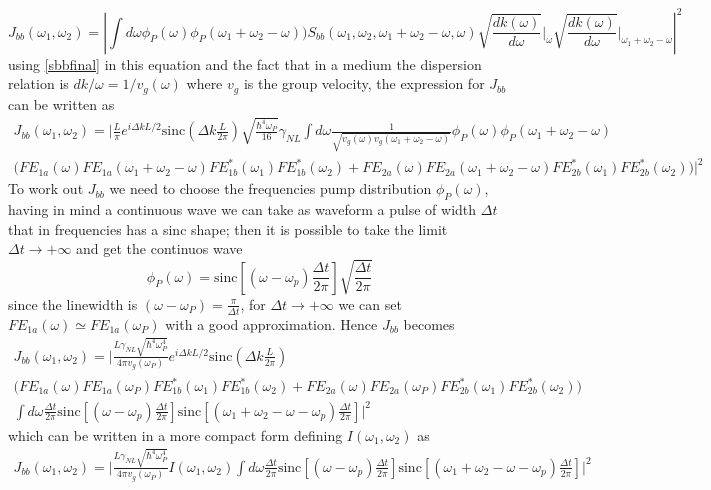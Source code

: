 \[J_{bb}(\omega_1,\omega_2) = \left|\int d\omega \phi_P(\omega)\phi_P(\omega_1 + \omega_2 - \omega))S_{bb}(\omega_1,\omega_2,\omega_1+\omega_2-\omega,\omega)\sqrt{ \frac{dk(\omega)}{d\omega}}\Bigg|_{\omega}\sqrt{\frac{dk(\omega)}{d\omega}}\Bigg|_{\omega_1+\omega_2-\omega} \right|^2\]
using \eqref{sbbfinal} in this equation and the fact that in a medium the dispersion relation is $dk/\omega = 1/v_g(\omega)$ where $v_g$ is the group velocity, the expression for $J_{bb}$ can be written as
\begin{multline}J_{bb}(\omega_1,\omega_2) = \Bigg|\frac{L}{\pi}e^{i\Delta k L/2} \text{sinc}\left(\Delta k \frac{L}{2\pi}\right) \sqrt{\frac{\hbar^4\omega_P}{16}}\gamma_{NL}\int d\omega \frac{1}{\sqrt{v_g(\omega)v_g(\omega_1+\omega_2 - \omega)}}\phi_P(\omega)\phi_P(\omega_1 + \omega_2 - \omega)\\ \Big( FE_{1a}(\omega)FE_{1a}(\omega_1+\omega_2-\omega)FE^*_{1b}(\omega_1)FE^*_{1b}(\omega_2) + FE_{2a}(\omega)FE_{2a}(\omega_1 + \omega_2-\omega)FE^*_{2b}(\omega_1)FE^*_{2b}(\omega_2)\Big)\Bigg|^2 \end{multline}
To work out $J_{bb}$ we need to choose the frequencies pump distribution $\phi_{P}(\omega)$, having in mind a continuous wave we can take as waveform a pulse of width $\Delta t$ that in frequencies has a sinc shape; then it is possible to take the limit $\Delta t \to +\infty$ and get the continuos wave
\[\phi_P(\omega) = \text{sinc}\left[(\omega-\omega_p) \frac{\Delta t}{2\pi} \right]\sqrt{\frac{\Delta t}{2\pi}}\]
since the linewidth is $(\omega - \omega_P)= \frac{\pi}{\Delta t}$, for $\Delta t \to +\infty$ we can set $FE_{1a}(\omega) \simeq FE_{1a}(\omega_P)$ with a good approximation. Hence $J_{bb}$ becomes
\begin{multline}J_{bb}(\omega_1,\omega_2) = \Bigg|\frac{L\gamma_{NL}\sqrt{\hbar^4\omega_P^4}}{4\pi v_g(\omega_P)}e^{i\Delta k L/2} \text{sinc}\left(\Delta k \frac{L}{2\pi}\right)\\ \Big( FE_{1a}(\omega)FE_{1a}(\omega_P)FE^*_{1b}(\omega_1)FE^*_{1b}(\omega_2) + FE_{2a}(\omega)FE_{2a}(\omega_P)FE^*_{2b}(\omega_1)FE^*_{2b}(\omega_2)\Big) \\ \int d\omega  \frac{\Delta t}{2\pi}\text{sinc}\left[(\omega-\omega_p) \frac{\Delta t}{2\pi} \right]\text{sinc}\left[(\omega_1+\omega_2-\omega-\omega_p) \frac{\Delta t}{2\pi} \right]\Bigg|^2\end{multline}
which can be written in a more compact form defining $I(\omega_1,\omega_2)$ as
\begin{multline}J_{bb}(\omega_1,\omega_2) = \Bigg|\frac{L\gamma_{NL}\sqrt{\hbar^4\omega_P^4}}{4\pi v_g(\omega_P)}I(\omega_1,\omega_2) \int d\omega  \frac{\Delta t}{2\pi}\text{sinc}\left[(\omega-\omega_p) \frac{\Delta t}{2\pi} \right]\text{sinc}\left[(\omega_1+\omega_2-\omega-\omega_p) \frac{\Delta t}{2\pi} \right]\Bigg|^2\end{multline}
